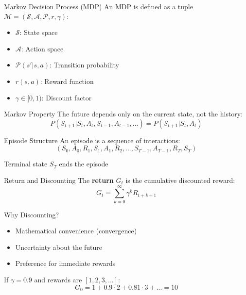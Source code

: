 \documentclass[aspectratio=169,10pt]{beamer}
\begin{document}
\begin{frame}{Markov Decision Process (MDP)}
An MDP is defined as a tuple $\mathcal{M} = (\mathcal{S}, \mathcal{A}, \mathcal{P}, r, \gamma)$:

\begin{itemize}
    \item $\mathcal{S}$: State space
    \item $\mathcal{A}$: Action space
    \item $\mathcal{P}(s'|s,a)$: Transition probability
    \item $r(s,a)$: Reward function
    \item $\gamma \in [0,1)$: Discount factor
\end{itemize}

\begin{block}{Markov Property}
The future depends only on the current state, not the history:
$$P(S_{t+1}|S_t, A_t, S_{t-1}, A_{t-1}, ...) = P(S_{t+1}|S_t, A_t)$$
\end{block}
\end{frame}

\begin{frame}{Episode Structure}
An episode is a sequence of interactions:
$$(S_0, A_0, R_1, S_1, A_1, R_2, ..., S_{T-1}, A_{T-1}, R_T, S_T)$$

\begin{center}
\end{center}

Terminal state $S_T$ ends the episode
\end{frame}

\begin{frame}{Return and Discounting}
The \textbf{return} $G_t$ is the cumulative discounted reward:
$$G_t = \sum_{k=0}^{\infty} \gamma^k R_{t+k+1}$$

\begin{block}{Why Discounting?}
\begin{itemize}
    \item Mathematical convenience (convergence)
    \item Uncertainty about the future
    \item Preference for immediate rewards
\end{itemize}
\end{block}

\begin{example}
If $\gamma = 0.9$ and rewards are $[1, 2, 3, ...]$:
$$G_0 = 1 + 0.9 \cdot 2 + 0.81 \cdot 3 + ... = 10$$
\end{example}
\end{frame}
\end{document}
